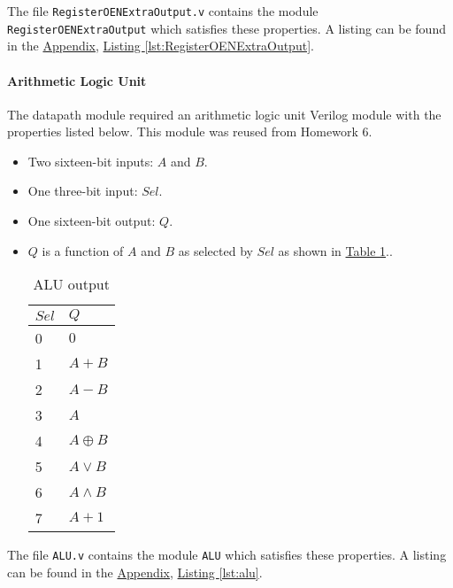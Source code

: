 The file \verb|RegisterOENExtraOutput.v| contains the module \verb|RegisterOENExtraOutput| which satisfies these properties.
A listing can be found in the \hyperref[sec:appendix]{Appendix}, \hyperref[lst:RegisterOENExtraOutput]{Listing \ref*{lst:RegisterOENExtraOutput}}.

\paragraph{Arithmetic Logic Unit} \label{par:alu}

The datapath module required an arithmetic logic unit Verilog module with the properties listed below.
This module was reused from Homework 6.

\begin{itemize}
    \item Two sixteen-bit inputs: $A$ and $B$.
    \item One three-bit input: $Sel$.
    \item One sixteen-bit output: $Q$.
    \item $Q$ is a function of $A$ and $B$ as selected by $Sel$ as shown in \hyperref[tab:alu]{Table \ref*{tab:alu}}..
        \begin{table}[htbp]
            \centering
            \begin{tabular}{ll}             \toprule
                $Sel$       & $Q$           \\\midrule
                0           & $0$           \\
                1           & $A + B$       \\
                2           & $A - B$       \\
                3           & $A$           \\
                4           & $A \oplus B$  \\
                5           & $A \lor B$    \\
                6           & $A \land B$   \\
                7           & $A + 1$       \\\bottomrule
            \end{tabular}
            \caption{ALU output}
            \label{tab:alu}
        \end{table}
\end{itemize}

The file \verb|ALU.v| contains the module \verb|ALU| which satisfies these properties.
A listing can be found in the \hyperref[sec:appendix]{Appendix}, \hyperref[lst:alu]{Listing \ref*{lst:alu}}.
